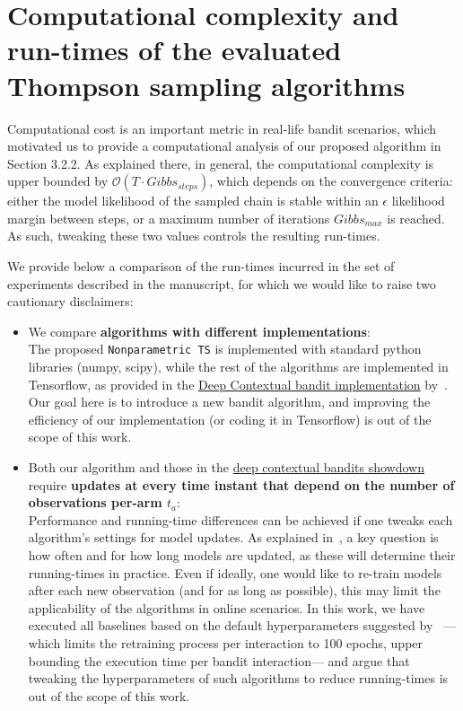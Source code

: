 \section{Computational complexity and run-times of the evaluated Thompson sampling algorithms}
\label{asec:exec_times}
Computational cost is an important metric in real-life bandit scenarios, which motivated us to provide a computational analysis of our proposed algorithm in Section 3.2.2. As explained there, in general, the computational complexity is upper bounded by $\mathcal{O}(T \cdot Gibbs_{steps})$, which depends on the convergence criteria: \ie either the model likelihood of the sampled chain is stable within an $\epsilon$ likelihood margin between steps, or a maximum number of iterations $Gibbs_{max}$ is reached. As such, tweaking these two values controls the resulting run-times.

We provide below a comparison of the run-times incurred in the set of experiments described in the manuscript, for which we would like to raise two cautionary disclaimers:
\begin{itemize}
	\item We compare \textbf{algorithms with different implementations}: \\
	The proposed \texttt{Nonparametric TS} is implemented with standard python libraries (\ie numpy, scipy), while the rest of the algorithms are implemented in Tensorflow, as provided in the \href{https://github.com/tensorflow/models/tree/master/research/deep_contextual_bandits}{Deep Contextual bandit implementation} by~\citet{ip-Riquelme2018}. Our goal here is to introduce a new bandit algorithm, and improving the efficiency of our implementation (or coding it in Tensorflow) is out of the scope of this work.
	\item Both our algorithm and those in the \href{https://sites.google.com/site/deepbayesianbandits/}{deep contextual bandits showdown} require \textbf{updates at every time instant that depend on the number of observations per-arm $t_a$}:\\
	Performance and running-time differences can be achieved if one tweaks each algorithm's settings for model updates. As explained in~\cite{ip-Riquelme2018}, a key question is how often and for how long models are updated, as these will determine their running-times in practice. Even if ideally, one would like to re-train models after each new observation (and for as long as possible), this may limit	the applicability of the algorithms in online scenarios. In this work, we have executed all baselines based on the default hyperparameters suggested by~\citet{ip-Riquelme2018} ---which limits the retraining process per interaction to 100 epochs, upper bounding the execution time per bandit interaction--- and argue that tweaking the hyperparameters of such algorithms to reduce running-times is out of the scope of this work.
\end{itemize}

